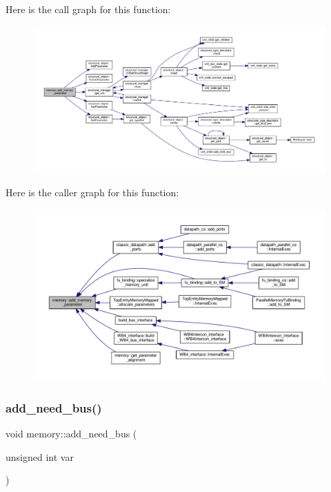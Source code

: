 Here is the call graph for this function\+:
\nopagebreak
\begin{figure}[H]
\begin{center}
\leavevmode
\includegraphics[width=350pt]{d8/d99/classmemory_a8ed6105d60330239af187ab2d414d019_cgraph}
\end{center}
\end{figure}
Here is the caller graph for this function\+:
\nopagebreak
\begin{figure}[H]
\begin{center}
\leavevmode
\includegraphics[width=350pt]{d8/d99/classmemory_a8ed6105d60330239af187ab2d414d019_icgraph}
\end{center}
\end{figure}
\mbox{\label{classmemory_ab229af9483c5f4defbce43877652c365}} 
\subsubsection{\texorpdfstring{add\+\_\+need\+\_\+bus()}{add\_need\_bus()}}
{\footnotesize\ttfamily void memory\+::add\+\_\+need\+\_\+bus (\begin{DoxyParamCaption}\item[{unsigned int}]{var }\end{DoxyParamCaption})\hspace{0.3cm}{\ttfamily [inline]}}



